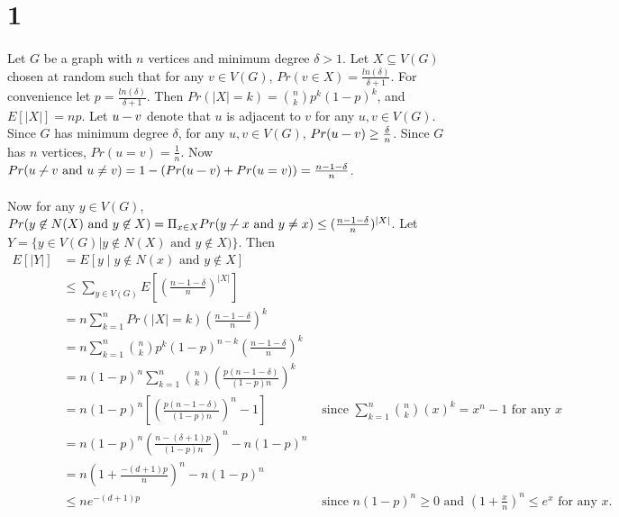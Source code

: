 \documentclass[letterpaper,12pt,oneside,onecolumn]{report}
\newcommand{\adjacent}[1][.7em]{\mathrel{\rule[.5ex]{#1}{.4pt}}}
\newcommand{\notadjacent}[1][.7em]{\mathrel{\centernot{\adjacent[#1]}}}
\begin{document}
\section*{1}
\paragraph{}
Let $G$ be a graph with $n$ vertices and minimum degree $\delta > 1$. Let $X \subseteq V(G)$ chosen at random such that for any $v \in V(G)$, $Pr(v \in X) = \frac{ln(\delta)}{\delta + 1}$. For convenience let $p = \frac{ln(\delta)}{\delta + 1}$. Then $Pr(|X| = k ) = {n \choose k} p^k (1-p)^k$, and $E[|X|] = np$. Let $u  \adjacent v$ denote that $u$ is adjacent to $v$ for any $u,v \in V(G)$. Since $G$ has minimum degree $\delta$, for any $u, v \in V(G)$, $Pr(u \adjacent v) \geq \frac{\delta}{n}$. Since $G$ has $n$ vertices, $Pr(u = v) = \frac{1}{n}$. Now $Pr(u \notadjacent v \text{ and } u \neq v) = 1 - (Pr(u \adjacent v) + Pr(u = v)) = \frac{n - 1- \delta}{n}$.
\paragraph{}
Now for any $y \in V(G)$, $Pr(y \not \in N(X) \text{ and } y \not\in X) = \Pi_{x \in X} Pr(y \notadjacent x \text{ and } y \neq x) \leq (\frac{n - 1- \delta}{n})^{|X|}$. Let $Y = \{y \in V(G) | y \not \in N(X) \text{ and } y \not\in X)\}$. Then
\begin{align*}
E[|Y|] &= E[y \mid y \not\in N(x) \text{ and } y \not\in X] \\
&\leq \sum_{y \in V(G)} E[(\frac{n - 1- \delta}{n})^{|X|}] \\
&= n \sum_{k = 1}^n Pr(|X| = k) (\frac{n - 1- \delta}{n})^{k} \\
&= n \sum_{k=1}^n {n \choose k} p^k (1-p)^{n-k} (\frac{n - 1- \delta}{n})^{k} \\
&= n(1-p)^n \sum_{k=1}^n {n \choose k} (\frac{p(n - 1- \delta)}{(1-p)n})^{k} \\
&=  n(1-p)^n [(\frac{p(n - 1- \delta)}{(1-p)n})^{n} - 1] &\text{ since $\sum_{k=1}^n {n \choose k} (x)^{k} = x^n - 1$ for any $x$}\\
&= n(1-p)^n (\frac{n - (\delta + 1)p}{(1-p)n})^n - n(1-p)^n \\
&= n(1 + \frac{-(d+1)p}{n})^n - n(1-p)^n \\
&\leq ne^{-(d+1)p} &\text{ since $n(1-p)^n \geq 0$ and $(1 + \frac{x}{n})^n \leq e^x$ for any $x$.}
\end{align*}
\end{document}
